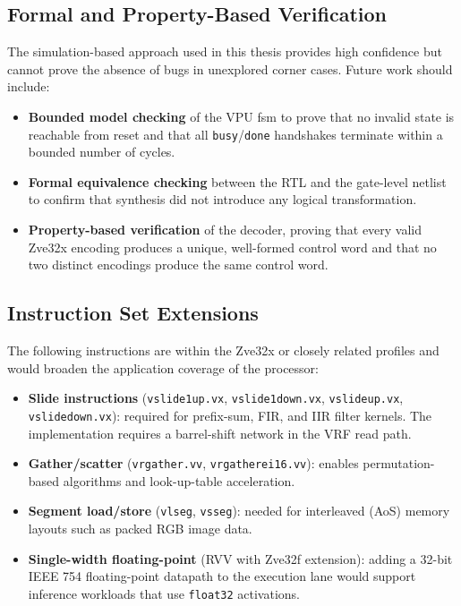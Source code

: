 \subsection{Formal and Property-Based Verification}

The simulation-based approach used in this thesis provides high confidence but cannot
prove the absence of bugs in unexplored corner cases. Future work should include:

\begin{itemize}
  \item \textbf{Bounded model checking} of the VPU \gls{fsm} to prove that no
        invalid state is reachable from reset and that all \texttt{busy}/\texttt{done}
        handshakes terminate within a bounded number of cycles.
  \item \textbf{Formal equivalence checking} between the RTL and the gate-level
        netlist to confirm that synthesis did not introduce any logical transformation.
  \item \textbf{Property-based verification} of the decoder, proving that every
        valid Zve32x encoding produces a unique, well-formed control word and that
        no two distinct encodings produce the same control word.
\end{itemize}

\subsection{Instruction Set Extensions}

The following instructions are within the Zve32x or closely related profiles and
would broaden the application coverage of the processor:

\begin{itemize}
  \item \textbf{Slide instructions} (\texttt{vslide1up.vx}, \texttt{vslide1down.vx},
        \texttt{vslideup.vx}, \texttt{vslidedown.vx}): required for prefix-sum,
        FIR, and IIR filter kernels. The implementation requires a barrel-shift network
        in the VRF read path.
  \item \textbf{Gather/scatter} (\texttt{vrgather.vv}, \texttt{vrgatherei16.vv}):
        enables permutation-based algorithms and look-up-table acceleration.
  \item \textbf{Segment load/store} (\texttt{vlseg}, \texttt{vsseg}): needed for
        interleaved (AoS) memory layouts such as packed RGB image data.
  \item \textbf{Single-width floating-point} (RVV with Zve32f extension): adding
        a 32-bit IEEE 754 floating-point datapath to the execution lane would support
        inference workloads that use \texttt{float32} activations.
\end{itemize}

